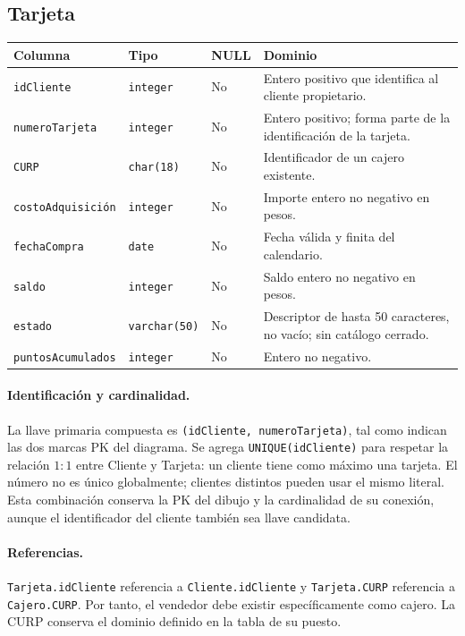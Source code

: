 \clearpage
\subsection{Tarjeta}

\noindent\begin{tabular}{@{}p{}p{}p{}p{}@{}}
\hline
\textbf{Columna} & \textbf{Tipo} & \textbf{NULL} & \textbf{Dominio} \\
\hline
\texttt{idCliente} & \texttt{integer} & No & Entero positivo que identifica al cliente propietario. \\
\texttt{numeroTarjeta} & \texttt{integer} & No & Entero positivo; forma parte de la identificación de la tarjeta. \\
\texttt{CURP} & \texttt{char(18)} & No & Identificador de un cajero existente. \\
\texttt{costoAdquisición} & \texttt{integer} & No & Importe entero no negativo en pesos. \\
\texttt{fechaCompra} & \texttt{date} & No & Fecha válida y finita del calendario. \\
\texttt{saldo} & \texttt{integer} & No & Saldo entero no negativo en pesos. \\
\texttt{estado} & \texttt{varchar(50)} & No & Descriptor de hasta 50 caracteres, no vacío; sin catálogo cerrado. \\
\texttt{puntosAcumulados} & \texttt{integer} & No & Entero no negativo. \\
\hline
\end{tabular}

\paragraph{Identificación y cardinalidad.}
La llave primaria compuesta es \texttt{(idCliente, numeroTarjeta)}, tal
como indican las dos marcas PK del diagrama. Se agrega
\texttt{UNIQUE(idCliente)} para respetar la relación $1:1$ entre Cliente
y Tarjeta: un cliente tiene como máximo una tarjeta. El número no es
único globalmente; clientes distintos pueden usar el mismo literal.
Esta combinación conserva la PK del dibujo y la cardinalidad de su
conexión, aunque el identificador del cliente también sea llave candidata.

\paragraph{Referencias.}
\texttt{Tarjeta.idCliente} referencia a \texttt{Cliente.idCliente} y
\texttt{Tarjeta.CURP} referencia a \texttt{Cajero.CURP}. Por tanto, el
vendedor debe existir específicamente como cajero. La CURP conserva
el dominio definido en la tabla de su puesto.

